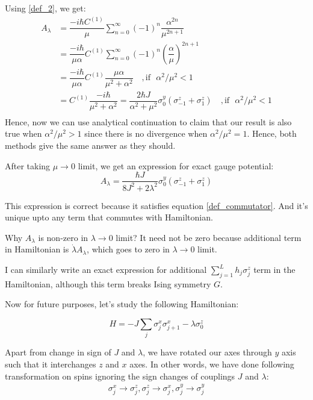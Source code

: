 \documentclass[11pt,a4paper]{article}
\begin{document}
Using \ref{def_2}, we get: %
\begin{align*}
A_{\lambda} &=  \dfrac{-i \hbar   C^{(1)}}{\mu}\sum_{n=0}^{\infty}   (-1)^{n} \dfrac{ \alpha^{2n}}{\mu^{2n+1}} \\
&=  \dfrac{-i \hbar }{\mu \alpha}  C^{(1)}\sum_{n=0}^{\infty}   (-1)^{n} \left(\dfrac{ \alpha}{\mu} \right)^{2n+1} \\
&=  \dfrac{-i \hbar }{\mu \alpha}  C^{(1)} \dfrac{\mu \alpha}{ \mu^2 + \alpha^2}\quad, \mbox{if ~}\alpha^2 / \mu^2 <1 \\
&=    C^{(1)}  \dfrac{ -i\hbar  }{ \mu^2 + \alpha^2}= \dfrac{2 \hbar J}{{\alpha^2 + \mu^2}} \sigma_0^y ( \sigma_{-1}^z + \sigma_1^z) \quad, \mbox{if ~} \alpha^2 / \mu^2 <1 \\
\end{align*}
Hence, now we can use analytical continuation to claim that our result is also true when $\alpha^2 / \mu^2 >1$ since there is no divergence when $\alpha^2 / \mu^2 =1$. Hence, both methods give the same answer as they should.

After taking $\mu \rightarrow 0$ limit, we get an expression for exact gauge potential:
\begin{equation}
\boxed{ A_{\lambda} = \dfrac{\hbar J}{{8 J^2 + 2 \lambda ^2 }} \sigma_0^y ( \sigma_{-1}^z + \sigma_1^z)}
\end{equation}

This expression is correct because it satisfies equation \ref{def_commutator}. And it's unique upto any term that commutes with Hamiltonian.



Why $A_{\lambda}$ is non-zero in $\lambda \rightarrow 0$ limit? It need not be zero because additional term in Hamiltonian is $\dot{\lambda} A_{\lambda}$, which goes to zero in $\lambda \rightarrow 0$ limit. 

I can similarly write an exact expression for additional $\sum_{j=1}^L h_j \sigma_j^z$ term in the Hamiltonian, although this term breaks Ising symmetry $G$.


Now for future purposes, let's study the following Hamiltonian:

\begin{equation}
H= -J \sum_{j}  \sigma_j^x \sigma_{j+1}^x -  \lambda  \sigma_0^z
\label{xx}
\end{equation}

Apart from change in sign of $J$ and $\lambda$, we have rotated our axes through $y$ axis such that it interchanges $z$ and $x$ axes. In other words, we have done following transformation on spins ignoring the sign changes of couplings $J$ and $\lambda$:
\begin{align*}
\sigma_j^x \rightarrow \sigma_j^z, \sigma_j^z \rightarrow  \sigma_j^x, \sigma_j^y \rightarrow \sigma_j^y
\end{align*}
\end{document}
